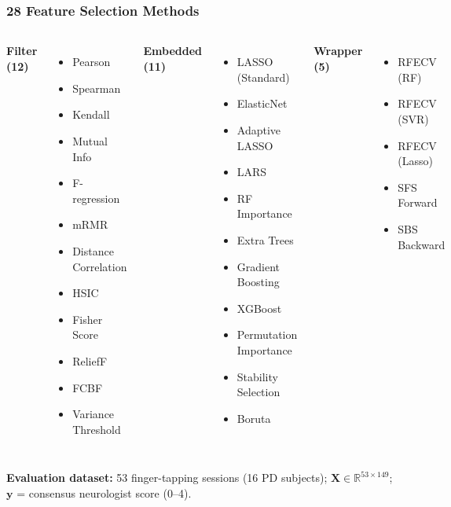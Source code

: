 \documentclass[aspectratio=169]{beamer}
\begin{document}
\begin{frame}
    \frametitle{28 Feature Selection Methods}
    \scriptsize
    \begin{columns}[T]
        \textbf{\textcolor{blue!70!black}{Filter (12)}}
        \begin{itemize}\setlength\itemsep{0em}
            \item Pearson
            \item Spearman
            \item Kendall
            \item Mutual Info
            \item F-regression
            \item mRMR
            \item Distance Correlation
            \item HSIC
            \item Fisher Score
            \item ReliefF
            \item FCBF
            \item Variance Threshold
        \end{itemize}
        \textbf{\textcolor{orange!80!black}{Embedded (11)}}
        \begin{itemize}\setlength\itemsep{0em}
            \item LASSO (Standard)
            \item ElasticNet
            \item Adaptive LASSO
            \item LARS
            \item RF Importance
            \item Extra Trees
            \item Gradient Boosting
            \item XGBoost
            \item Permutation Importance
            \item Stability Selection
            \item Boruta
        \end{itemize}
        \textbf{\textcolor{green!50!black}{Wrapper (5)}}
        \begin{itemize}\setlength\itemsep{0em}
            \item RFECV (RF)
            \item RFECV (SVR)
            \item RFECV (Lasso)
            \item SFS Forward
            \item SBS Backward
        \end{itemize}
    \end{columns}
    \vspace{0.5em}
    \scriptsize
    \textbf{Evaluation dataset:} 53 finger-tapping sessions (16 PD subjects);
    $\mathbf{X} \in \mathbb{R}^{53 \times 149}$; $\mathbf{y}$ = consensus neurologist score (0--4).
\end{frame}
\end{document}
